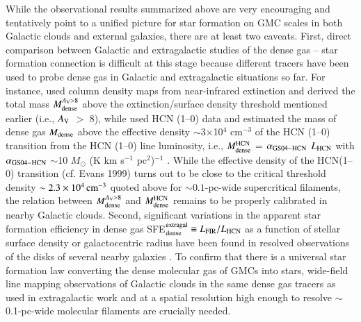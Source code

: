 \documentclass{aa}
\begin{document}
While the observational results summarized above are very encouraging and tentatively point to a unified picture for star formation 
on GMC scales in both Galactic clouds and external galaxies, there are at least two caveats.  
First, direct comparison between Galactic \citep[e.g.][]{Lada10} 
and extragalactic \citep[e.g.][]{Gao04a} studies of the dense gas -- star formation connection is difficult 
at this stage because different tracers have been used to probe dense gas in Galactic and extragalactic situations so far.
For instance, \citet{Lada10} 
used column density maps from near-infrared 
extinction 
and derived the total mass $M^{A_{\rm V} > 8}_{\rm dense} $ above the extinction/surface density threshold mentioned 
earlier (i.e.,  $A_{\rm V}$ $>$ 8), while \citet{Gao04a} used HCN (1--0) data and estimated the mass of dense gas $M_{\rm dense}$ above 
the effective density $\sim$3$\times$10$^{4}$ cm$^{-3}$ of the HCN (1--0) transition from the HCN (1--0) line luminosity, i.e., 
$M^{\rm HCN}_{\rm dense}$ = $\alpha_{\rm GS04-HCN}$ $L_{\rm HCN}$ with 
$\alpha_{\rm GS04-HCN}$ $\sim$10 $M_{\odot}$ (K km s$^{-1}$ pc$^2$)$^{-1}$ \citep[see also][]{Wu05}. 
While the effective density of the HCN(1--0) transition (cf. Evans 1999) turns out to be close to the critical threshold density 
$\sim 2.3 \times 10^4\, \rm{cm}^{-3} $ quoted  above for $\sim 0.1$-pc-wide supercritical filaments, 
the relation between $M^{A_{\rm V} > 8}_{\rm dense} $ and $M^{\rm HCN}_{\rm dense} $ remains 
to be properly calibrated in nearby Galactic clouds.
Second, significant variations in the apparent star formation efficiency in dense gas SFE$^{\rm extragal}_{\rm dense} \equiv L_{\rm FIR}/L_{\rm HCN}$ 
as a function of stellar surface density or galactocentric radius 
have been found in resolved observations of the disks of several nearby galaxies \citep[][]{Usero15,Chen15,Leroy16, Bigiel16}. 
To confirm that there is a universal 
star formation law converting the dense molecular gas of GMCs
into stars, wide-field line mapping observations of Galactic clouds in the same dense gas tracers as used in extragalactic work
and at a spatial resolution high enough to resolve $\sim$0.1-pc-wide molecular filaments 
are crucially needed.
\end{document}
